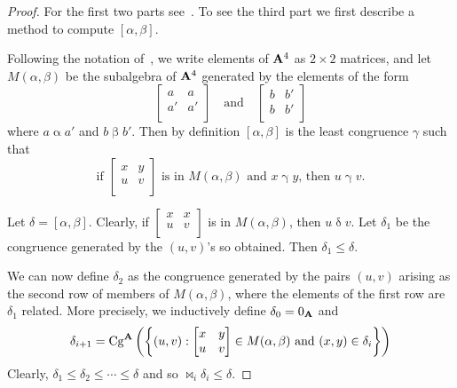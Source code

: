 \documentclass{ws-ijac}
\begin{document}
\begin{proof}
For the first two parts see~\cite[Proposition~6.1]{Freese:2009}.
To see the third part we first describe a method to compute
$[\alpha,\beta]$.


Following the notation of~\cite{FreeseMcKenzie1987}, we write
elements of $\mathbf{A}^4$ as $2 \times 2$ matrices, and
let $M(\alpha,\beta)$ be the subalgebra of $\mathbf{A}^4$ generated by
the elements of the form
\[
\begin{bmatrix}
a & a\\
a' & a'\\
\end{bmatrix}
\quad \text{and} \quad
\begin{bmatrix}
b & b'\\
b & b'\\
\end{bmatrix}
\]
where $a \mathrel\alpha a'$ and $b \mathrel\beta b'$. Then
by definition
$[\alpha,\beta]$ is the least congruence $\gamma$ such that
\begin{equation}\label{commprop}\text{if }
\begin{bmatrix}
x & y\\
u & v\\
\end{bmatrix}
\text{ is in $M(\alpha,\beta)$ and $x \mathrel\gamma y$,
then $u \mathrel\gamma v$.}
\end{equation}

Let $\delta = [\alpha,\beta]$. Clearly, if
$\begin{bmatrix}
x & x\\
u & v\\
\end{bmatrix}$ is in  $M(\alpha,\beta)$, then $u \mathrel\delta v$.
Let $\delta_1$ be the congruence generated by the $(u,v)$'s so
obtained. Then $\delta_1 \le \delta$.





We can now define $\delta_2$ as the congruence generated by the pairs
$(u,v)$ arising as the second row of members of $M(\alpha,\beta)$,
where the elements of the first row are $\delta_1$ related.
More precisely, we inductively define $\delta_0 = 0_{\mathbf{A}}$ and
\begin{equation}\label{delta}
\delta_{i+1} = \operatorname{Cg}^{\alg A}\bigg(\bigg\{(u,v) :
\begin{bmatrix}
x & y \\
u & v\\
\end{bmatrix}
\in M(\alpha,\beta) \text{ and } (x,y) \in \delta_i\bigg\}\bigg)
\end{equation}
Clearly, $\delta_1 \le \delta_2 \le \cdots \le
\delta$ and so $\Join_i \delta_i \le \delta$.


\end{proof}
\end{document}
